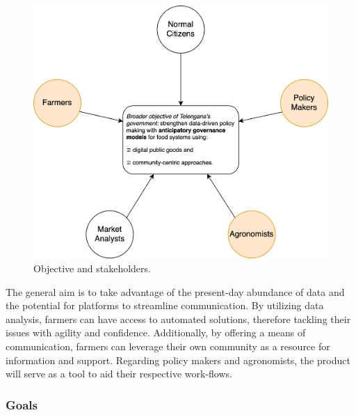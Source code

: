 \begin{figure}[hbt!]
\centering
\includegraphics[scale=0.6]{../images_diagrams/stakeholders_in_broader_gov_objective.png}
\caption{Objective and stakeholders.}
\label{fig:stakeholders}
\end{figure}

\begin{flushleft}
The general aim is to take advantage of the present-day abundance of data and the potential for platforms to streamline communication. By utilizing data analysis, farmers can have access to automated solutions, therefore tackling their issues with agility and confidence. Additionally, by offering a means of communication, farmers can leverage their own community as a resource for information and support. Regarding policy makers and agronomists, the product will serve as a tool to aid their respective work-flows. 
\end{flushleft}

\subsubsection{Goals} \label{goalsection}

